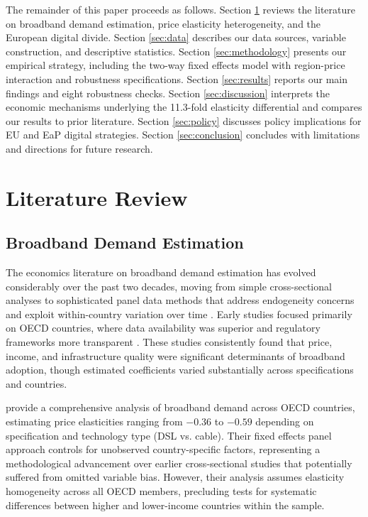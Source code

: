 \documentclass[12pt,review]{elsarticle}
\begin{document}
The remainder of this paper proceeds as follows. Section \ref{sec:literature} reviews the literature on broadband demand estimation, price elasticity heterogeneity, and the European digital divide. Section \ref{sec:data} describes our data sources, variable construction, and descriptive statistics. Section \ref{sec:methodology} presents our empirical strategy, including the two-way fixed effects model with region-price interaction and robustness specifications. Section \ref{sec:results} reports our main findings and eight robustness checks. Section \ref{sec:discussion} interprets the economic mechanisms underlying the 11.3-fold elasticity differential and compares our results to prior literature. Section \ref{sec:policy} discusses policy implications for EU and EaP digital strategies. Section \ref{sec:conclusion} concludes with limitations and directions for future research.

\section{Literature Review}
\label{sec:literature}

\subsection{Broadband Demand Estimation}

The economics literature on broadband demand estimation has evolved considerably over the past two decades, moving from simple cross-sectional analyses to sophisticated panel data methods that address endogeneity concerns and exploit within-country variation over time \citep{roller1996telecommunications}. Early studies focused primarily on OECD countries, where data availability was superior and regulatory frameworks more transparent \citep{cardona2009demand}. These studies consistently found that price, income, and infrastructure quality were significant determinants of broadband adoption, though estimated coefficients varied substantially across specifications and countries.

\citet{cardona2009demand} provide a comprehensive analysis of broadband demand across OECD countries, estimating price elasticities ranging from $-0.36$ to $-0.59$ depending on specification and technology type (DSL vs. cable). Their fixed effects panel approach controls for unobserved country-specific factors, representing a methodological advancement over earlier cross-sectional studies that potentially suffered from omitted variable bias. However, their analysis assumes elasticity homogeneity across all OECD members, precluding tests for systematic differences between higher and lower-income countries within the sample.
\end{document}
